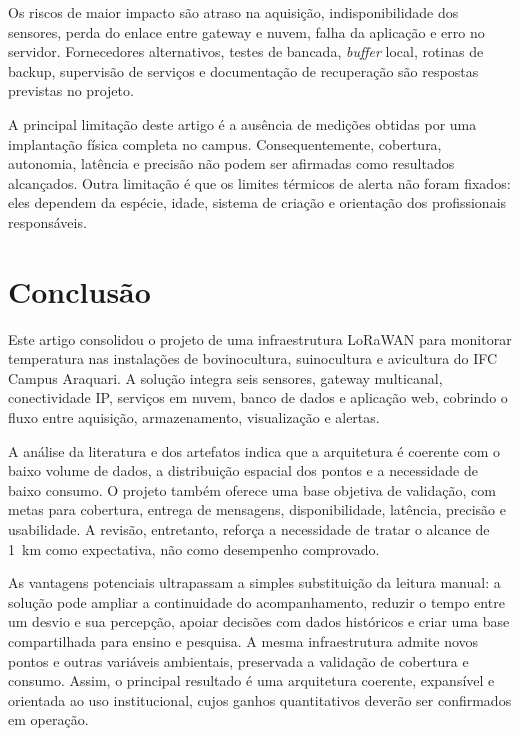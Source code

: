 \documentclass[10pt,a4paper,twocolumn]{article}
\begin{document}
Os riscos de maior impacto são atraso na aquisição, indisponibilidade dos
sensores, perda do enlace entre gateway e nuvem, falha da aplicação e erro no
servidor. Fornecedores alternativos, testes de bancada, \textit{buffer} local,
rotinas de backup, supervisão de serviços e documentação de recuperação são
respostas previstas no projeto.

A principal limitação deste artigo é a ausência de medições obtidas por uma
implantação física completa no campus. Consequentemente, cobertura, autonomia,
latência e precisão não podem ser afirmadas como resultados alcançados. Outra
limitação é que os limites térmicos de alerta não foram fixados: eles dependem da
espécie, idade, sistema de criação e orientação dos profissionais responsáveis.

\section{Conclusão}

Este artigo consolidou o projeto de uma infraestrutura LoRaWAN para monitorar
temperatura nas instalações de bovinocultura, suinocultura e avicultura do IFC
Campus Araquari. A solução integra seis sensores, gateway multicanal,
conectividade IP, serviços em nuvem, banco de dados e aplicação web, cobrindo o
fluxo entre aquisição, armazenamento, visualização e alertas.

A análise da literatura e dos artefatos indica que a arquitetura é coerente com
o baixo volume de dados, a distribuição espacial dos pontos e a necessidade de
baixo consumo. O projeto também oferece uma base objetiva de validação, com metas
para cobertura, entrega de mensagens, disponibilidade, latência, precisão e
usabilidade. A revisão, entretanto, reforça a necessidade de tratar o alcance de
\SI{1}{\kilo\meter} como expectativa, não como desempenho comprovado.

As vantagens potenciais ultrapassam a simples substituição da leitura manual: a
solução pode ampliar a continuidade do acompanhamento, reduzir o tempo entre um
desvio e sua percepção, apoiar decisões com dados históricos e criar uma base
compartilhada para ensino e pesquisa. A mesma infraestrutura admite novos pontos
e outras variáveis ambientais, preservada a validação de cobertura e consumo.
Assim, o principal resultado é uma arquitetura coerente, expansível e
orientada ao uso institucional, cujos ganhos quantitativos deverão ser
confirmados em operação.


\end{document}
